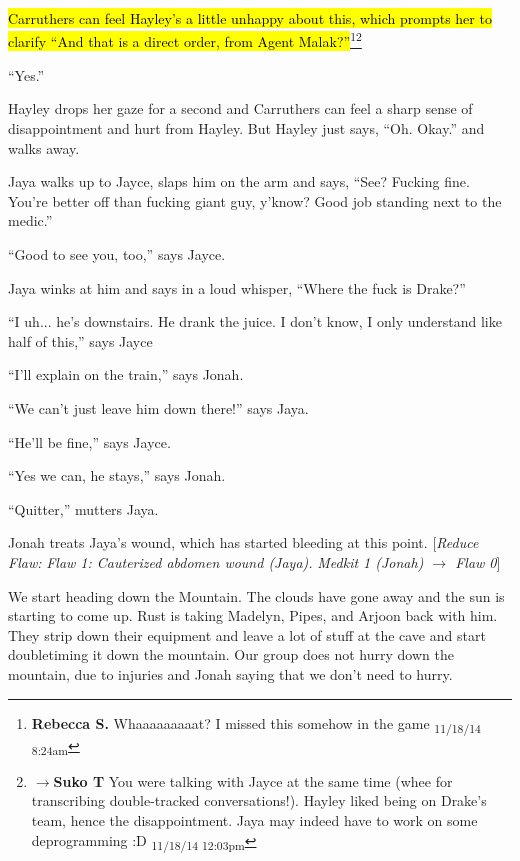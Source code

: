 \hl{Carruthers can feel Hayley's a little unhappy about this, which prompts her to clarify ``And that is a direct order, from Agent Malak?''}\footnote{\textbf{Rebecca S. }Whaaaaaaaaat? 
I missed this somehow in the game \textsubscript{11/18/14 8:24am}}\footnote{$\rightarrow$\textbf{Suko T }You were talking with Jayce at the same time (whee for transcribing double-tracked conversations!).  Hayley liked being on Drake's team, hence the disappointment.  Jaya may indeed have to work on some deprogramming :D \textsubscript{11/18/14 12:03pm}}

``Yes.''

Hayley drops her gaze for a second and Carruthers can feel a sharp sense of disappointment and hurt from Hayley.  But Hayley just says, ``Oh.  Okay.'' and walks away.



Jaya walks up to Jayce, slaps him on the arm and says, ``See?  Fucking fine.  You're better off than fucking giant guy, y'know?  Good job standing next to the medic.''

``Good to see you, too,'' says Jayce.

Jaya winks at him and says in a loud whisper, ``Where the fuck is Drake?''

``I uh... he's downstairs.   He drank the juice.  I don't know, I only understand like half of this,'' says Jayce

``I'll explain on the train,'' says Jonah.

``We can't just leave him down there!'' says Jaya.

``He'll be fine,'' says Jayce.

``Yes we can, he stays,'' says Jonah.

``Quitter,'' mutters Jaya.



Jonah treats Jaya's wound, which has started bleeding at this point.  {[}\textit{Reduce Flaw: }\textit{ {\color[RGB]{255,0,0}Flaw 1: Cauterized abdomen wound (Jaya).} }\textit{  Medkit 1 (Jonah) $\rightarrow$ Flaw 0}{]}





We start heading down the Mountain.  The clouds have gone away and the sun is starting to come up.  Rust is taking Madelyn, Pipes, and Arjoon back with him. They strip down their equipment and leave a lot of stuff at the cave and start doubletiming it down the mountain.  Our group does not hurry down the mountain, due to injuries and Jonah saying that we don't need to hurry.



